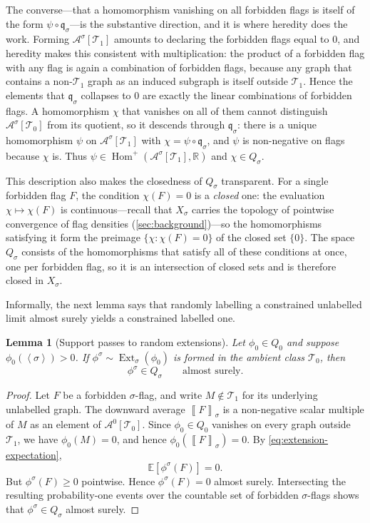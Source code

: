 \documentclass[11pt]{article}
\newtheorem{lemma}[theorem]{Lemma}
\theoremstyle{definition}
\newcommand{\R}{\mathbb{R}}
\newcommand{\E}{\mathbb{E}}
\newcommand{\A}{\mathcal{A}}
\newcommand{\T}{\mathcal{T}}
\newcommand{\Homp}{\operatorname{Hom}^{+}}
\newcommand{\Ext}{\operatorname{Ext}}
\newcommand{\brak}[1]{\left\langle #1\right\rangle}
\newcommand{\avg}[2]{\left\llbracket #1 \right\rrbracket_{#2}}
\newcommand{\qmap}{\mathfrak q}
\begin{document}
The converse---that a homomorphism vanishing on all forbidden flags is itself of the form
$\psi\circ\qmap_\sigma$---is the substantive direction, and it is where heredity does the
work.  Forming $\A^\sigma[\T_1]$ amounts to declaring the forbidden flags equal to $0$, and
heredity makes this consistent with multiplication: the product of a forbidden flag with
any flag is again a combination of forbidden flags, because any graph that contains a
non-$\T_1$ graph as an induced subgraph is itself outside $\T_1$.  Hence the elements that
$\qmap_\sigma$ collapses to $0$ are exactly the linear combinations of forbidden flags.  A
homomorphism $\chi$ that vanishes on all of them cannot distinguish $\A^\sigma[\T_0]$ from
its quotient, so it descends through $\qmap_\sigma$: there is a unique homomorphism $\psi$
on $\A^\sigma[\T_1]$ with $\chi=\psi\circ\qmap_\sigma$, and $\psi$ is non-negative on flags
because $\chi$ is.  Thus $\psi\in\Homp(\A^\sigma[\T_1],\R)$ and $\chi\in Q_\sigma$.

This description also makes the closedness of $Q_\sigma$ transparent.  For a single
forbidden flag $F$, the condition $\chi(F)=0$ is a \emph{closed} one: the evaluation
$\chi\mapsto\chi(F)$ is continuous---recall that $X_\sigma$ carries the topology of
pointwise convergence of flag densities (\cref{sec:background})---so the homomorphisms
satisfying it form the preimage $\{\chi:\chi(F)=0\}$ of the closed set $\{0\}$.  The space
$Q_\sigma$ consists of the homomorphisms that satisfy all of these conditions at once, one
per forbidden flag, so it is an intersection of closed sets and is therefore closed in
$X_\sigma$.

Informally, the next lemma says that randomly labelling a constrained unlabelled limit
almost surely yields a constrained labelled one.

\begin{lemma}[Support passes to random extensions]\label{lem:support-passes-general}
Let $\phi_0\in Q_0$ and suppose $\phi_0(\brak\sigma)>0$.  If
$\phi^\sigma\sim\Ext_\sigma(\phi_0)$ is formed in the ambient class $\T_0$,
then
\[
  \phi^\sigma\in Q_\sigma
  \qquad\text{almost surely.}
\]
\end{lemma}

\begin{proof}
Let $F$ be a forbidden $\sigma$-flag, and write $M\notin\T_1$ for its underlying unlabelled
graph.  The downward average $\avg{F}{\sigma}$ is a non-negative scalar multiple of $M$ as
an element of $\A^0[\T_0]$.  Since $\phi_0\in Q_0$ vanishes on every graph outside $\T_1$,
we have $\phi_0(M)=0$, and hence $\phi_0(\avg{F}{\sigma})=0$.  By \eqref{eq:extension-expectation},
\[
  \E[\phi^\sigma(F)]=0.
\]
But $\phi^\sigma(F)\ge0$ pointwise.  Hence $\phi^\sigma(F)=0$ almost surely.
Intersecting the resulting probability-one events over the countable set of
forbidden $\sigma$-flags shows that $\phi^\sigma\in Q_\sigma$ almost surely.
\end{proof}
\end{document}
